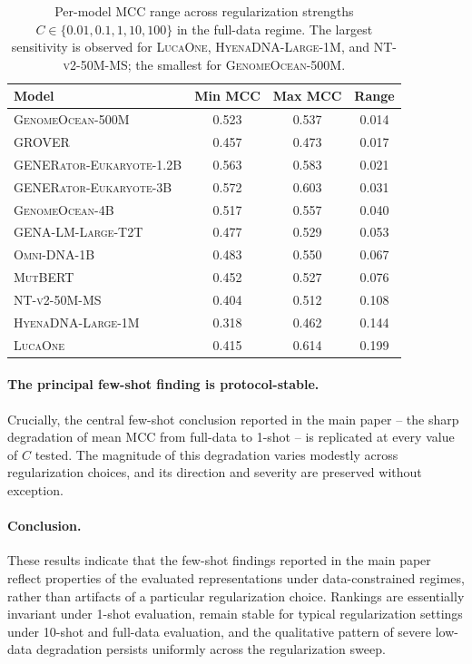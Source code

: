 \documentclass{article}
\theoremstyle{plain}
\theoremstyle{definition}
\theoremstyle{remark}
\begin{document}
\begin{table}[h]
\centering
\caption{Per-model MCC range across regularization strengths
$C \in \{0.01, 0.1, 1, 10, 100\}$ in the full-data regime. The largest
sensitivity is observed for \textsc{LucaOne}, \textsc{HyenaDNA-Large-1M},
and \textsc{NT-v2-50M-MS}; the smallest for \textsc{GenomeOcean-500M}.}
\label{tab:fewshot_ranges}
\small
\begin{tabular}{@{}lccc@{}}
\toprule
\textbf{Model} & \textbf{Min MCC} & \textbf{Max MCC} & \textbf{Range} \\
\midrule
\textsc{GenomeOcean-500M}          & 0.523 & 0.537 & 0.014 \\
\textsc{GROVER}                     & 0.457 & 0.473 & 0.017 \\
\textsc{GENERator-Eukaryote-1.2B}  & 0.563 & 0.583 & 0.021 \\
\textsc{GENERator-Eukaryote-3B}    & 0.572 & 0.603 & 0.031 \\
\textsc{GenomeOcean-4B}            & 0.517 & 0.557 & 0.040 \\
\textsc{GENA-LM-Large-T2T}         & 0.477 & 0.529 & 0.053 \\
\textsc{Omni-DNA-1B}                & 0.483 & 0.550 & 0.067 \\
\textsc{MutBERT}                    & 0.452 & 0.527 & 0.076 \\
\textsc{NT-v2-50M-MS}              & 0.404 & 0.512 & 0.108 \\
\textsc{HyenaDNA-Large-1M}         & 0.318 & 0.462 & 0.144 \\
\textsc{LucaOne}                    & 0.415 & 0.614 & 0.199 \\
\bottomrule
\end{tabular}
\end{table}

\paragraph{The principal few-shot finding is protocol-stable.}
Crucially, the central few-shot conclusion reported in the main
paper -- the sharp degradation of mean MCC from full-data to 1-shot -- is
replicated at every value of $C$ tested. The magnitude of this
degradation varies modestly across regularization choices, and its
direction and severity are preserved without exception.

\paragraph{Conclusion.}
These results indicate that the few-shot findings reported in the main
paper reflect properties of the evaluated representations under
data-constrained regimes, rather than artifacts of a particular
regularization choice. Rankings are essentially invariant under 1-shot
evaluation, remain stable for typical regularization settings under
10-shot and full-data evaluation, and the qualitative pattern of severe
low-data degradation persists uniformly across the regularization sweep.
\end{document}
